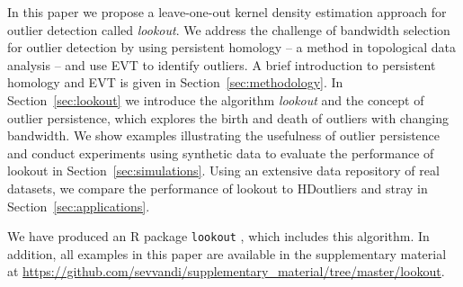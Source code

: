 \documentclass[letter,12pt]{article}
\begin{document}
In this paper we propose a leave-one-out kernel density estimation approach for outlier detection called \textit{lookout}. 
We address the challenge of bandwidth selection for outlier detection by using persistent homology -- a method in topological data analysis -- and use EVT to identify outliers.  A brief introduction to persistent homology and EVT is given in Section~\ref{sec:methodology}.
In Section~\ref{sec:lookout} we introduce the algorithm \textit{lookout} and the concept of outlier persistence, which explores the birth and death of outliers with changing bandwidth. 
We show examples illustrating the usefulness of outlier persistence and conduct experiments using synthetic data to evaluate the performance of lookout in  Section~\ref{sec:simulations}. Using an extensive data repository of real datasets, we compare the performance of lookout to HDoutliers and stray in Section~\ref{sec:applications}. 

We have produced an R package \texttt{lookout} \citep{lookoutR}, which includes this algorithm. In addition, all examples in this paper are available in the supplementary material at \url{https://github.com/sevvandi/supplementary_material/tree/master/lookout}. 




\end{document}
